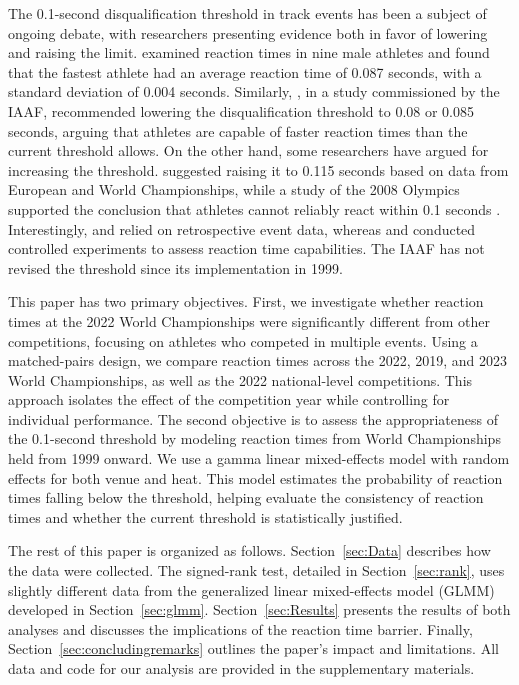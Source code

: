 \documentclass[12pt, letterpaper]{article}
\begin{document}
The 0.1-second disqualification threshold in track events has been 
a subject of ongoing debate, with researchers presenting evidence 
both in favor of lowering and raising the
limit. \citet{pain2007sprint} examined
reaction times in nine male athletes and found that the fastest athlete 
had an average reaction time of 0.087 seconds, with a standard deviation 
of 0.004 seconds. Similarly, \citet{komi2009iaaf}, in a study commissioned 
by the IAAF, recommended lowering the disqualification threshold to 0.08 
or 0.085 seconds, arguing that athletes are capable of faster reaction 
times than the current threshold allows. On the other hand, some 
researchers have argued for increasing the threshold.
\citet{brosnan2017effects} suggested raising it to 0.115 seconds based
on data from European and World Championships, while a study of the
2008 Olympics supported the conclusion that athletes cannot reliably
react within 0.1 seconds \citep{lipps2011implications}. Interestingly,
\citet{brosnan2017effects} and \citet{lipps2011implications} relied on
retrospective event data, whereas \citet{pain2007sprint} and
\citet{komi2009iaaf} conducted controlled experiments to assess
reaction time capabilities. The IAAF has not revised the threshold
since its implementation in 1999.


This paper has two primary objectives. First, we investigate whether 
reaction times at the 2022 World Championships were significantly 
different from other competitions, focusing on athletes who competed 
in multiple events. Using a matched-pairs design, we compare reaction 
times across the 2022, 2019, and 2023 World Championships, as well as 
the 2022 national-level competitions. This approach isolates the 
effect of the competition year while controlling for individual 
performance. The second objective is to assess the 
appropriateness of the 0.1-second threshold by modeling reaction 
times from World Championships held from 1999 onward. We use a gamma 
linear mixed-effects model with random effects for both venue and heat. 
This model estimates the probability of reaction times falling below 
the threshold, helping evaluate the consistency of reaction times and 
whether the current threshold is statistically justified.


The rest of this paper is organized as follows. Section~\ref{sec:Data} 
describes how the data were collected. The signed-rank test, detailed 
in Section~\ref{sec:rank}, uses slightly different data from the 
generalized linear mixed-effects model (GLMM) developed in 
Section~\ref{sec:glmm}. Section~\ref{sec:Results} presents the results 
of both analyses and discusses the implications of the reaction time 
barrier. Finally, Section~\ref{sec:concludingremarks} outlines the 
paper’s impact and limitations. All data and code for our analysis 
are provided in the supplementary materials.
\end{document}
